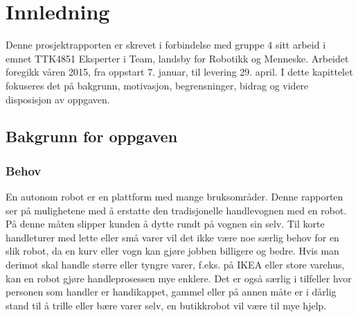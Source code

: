 
\chapter{Innledning} %

\label{ch:innledning} %

Denne prosjektrapporten er skrevet i forbindelse med gruppe 4 sitt arbeid i emnet TTK4851 Eksperter i Team, landsby for Robotikk og Menneske. Arbeidet foregikk våren 2015, fra oppstart 7. januar, til levering 29. april. I dette kapittelet fokuseres det på bakgrunn, motivasjon, begrensninger, bidrag og videre disposisjon av oppgaven. 

\section{Bakgrunn for oppgaven}


\subsection{Behov}

En autonom robot er en plattform med mange bruksområder. Denne rapporten ser på mulighetene med å erstatte den tradisjonelle handlevognen med en robot. På denne måten slipper kunden å dytte rundt på vognen sin selv. Til korte handleturer med lette eller små varer vil det ikke være noe særlig behov for en slik robot, da en kurv eller vogn kan gjøre jobben billigere og bedre. Hvis man derimot skal handle større eller tyngre varer, f.eks. på IKEA eller store varehus, kan en robot gjøre handleprosessen mye enklere. Det er også særlig i tilfeller hvor personen som handler er handikappet, gammel eller på annen måte er i dårlig stand til å trille eller bære varer selv, en butikkrobot vil være til mye hjelp. 

